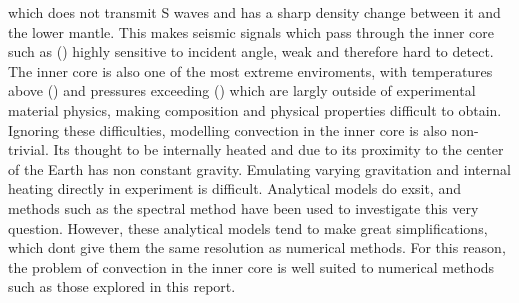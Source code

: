 \documentclass{article}
\begin{document}
which does not transmit S 
waves and has a sharp density change between it and the lower mantle. This makes seismic signals which pass through the inner core such as () highly sensitive to incident angle, weak and therefore hard to detect. The inner core is also one of the most extreme enviroments, with temperatures above () and pressures exceeding () which are 
largly outside of experimental material physics, making composition and physical properties difficult to obtain. 
\newline
Ignoring these difficulties, modelling convection in the inner core is also non-trivial. Its thought to be internally heated and due to its proximity to the center of the Earth has non constant gravity. Emulating varying gravitation and internal heating directly in experiment is difficult. Analytical models do exsit, and methods such as the spectral method have been used to investigate this very question. However, these analytical models tend to make great simplifications, which dont give them the same resolution as numerical methods. For this reason, the problem of convection in the inner core is well suited to numerical methods such as those explored in this report.




\end{document}
